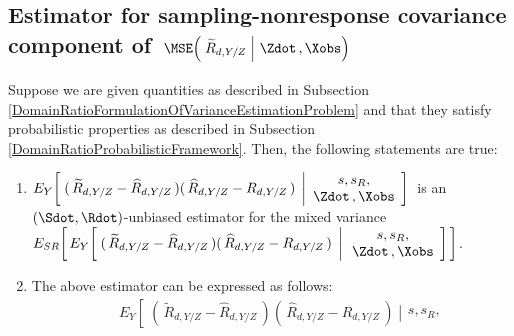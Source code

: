 
\vskip 0.5cm
\subsection{Estimator for sampling-nonresponse covariance component of
\,$\MSE\!\left(\,\left.\widetilde{R}_{d,Y/Z}\;\right\vert\,\Zdot\,,\Xobs\right)$}
\setcounter{theorem}{0}


\begin{lemma}
\label{DomainRatioMixedVariance}
\mbox{}
\vskip 0.1cm
\noindent
Suppose we are given quantities as described in Subsection
\ref{DomainRatioFormulationOfVarianceEstimationProblem}
and
that they satisfy probabilistic properties as described in Subsection
\ref{DomainRatioProbabilisticFramework}.
\vskip 0.1cm
\noindent
Then, the following statements are true:
\renewcommand{\theenumi}{\roman{enumi}}
\renewcommand{\labelenumi}{\mbox{}\;\;\,(\theenumi)$\quad$}
\begin{enumerate}
\item
    $
    E_{Y}\!\left[\;
        (\,\widetilde{R}_{d,Y/Z} - \widehat{R}_{d,Y/Z}\,)
        (\,  \widehat{R}_{d,Y/Z} - R_{d,Y/Z}\,)
        \;\left\vert
        \begin{array}{c}
            s,s_{R},
            \\
            \Zdot\,,\Xobs
            \end{array}
        \right.
        \!\right]
    $\,
    is an $(\Sdot,\Rdot)$-unbiased estimator for the mixed variance
    \,$
    E_{SR}\!\left[\,
    E_{Y}\!\left[\;
        (\,\widetilde{R}_{d,Y/Z} - \widehat{R}_{d,Y/Z}\,)
        (\,  \widehat{R}_{d,Y/Z} - R_{d,Y/Z}\,)
        \;\left\vert\,
        \begin{array}{c}
            s,s_{R},
            \\
            \Zdot\,,\Xobs
            \end{array}
        \right.
        \!\right]
        \,\right]
    $.
\item
    The above estimator can be expressed as follows:
    \begin{eqnarray*}
    &&
        E_{Y}\!\left[\;
            (\,\widetilde{R}_{d,Y/Z} - \widehat{R}_{d,Y/Z}\,)
            (\,  \widehat{R}_{d,Y/Z} - R_{d,Y/Z}\,)
            \;\left\vert
            \begin{array}{c}
                s,s_{R},

\end{array}
\end{eqnarray*}
\end{enumerate}
\end{lemma}
